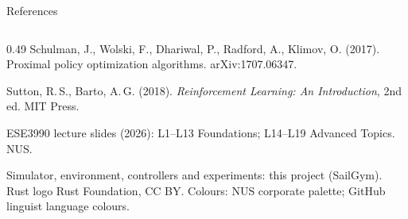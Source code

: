 \documentclass[aspectratio=169,11pt]{beamer}
\begin{document}
\begin{frame}{References}
\begin{columns}[T]
\begin{column}{0.49\textwidth}
      Schulman, J., Wolski, F., Dhariwal, P., Radford, A., Klimov, O. (2017). Proximal policy optimization algorithms. arXiv:1707.06347.\par
      Sutton, R.\,S., Barto, A.\,G. (2018). \emph{Reinforcement Learning: An Introduction}, 2nd ed. MIT Press.\par
      ESE3990 lecture slides (2026): L1--L13 Foundations; L14--L19 Advanced Topics. NUS.\par
      \vspace{4pt}
      \textcolor{black!55}{Simulator, environment, controllers and experiments: this project (SailGym).
      Rust logo \textcopyright{} Rust Foundation, CC BY. Colours: NUS corporate palette; GitHub linguist language colours.}\par
    \end{column}
  \end{columns}
\end{frame}
\end{document}
